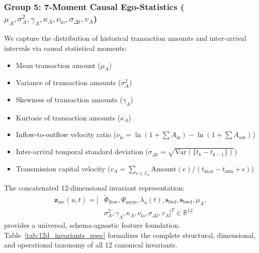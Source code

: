 \subsubsection{Group 5: 7-Moment Causal Ego-Statistics ($\mu_A, \sigma_A^2, \gamma_A, \kappa_A, \nu_{\text{io}}, \sigma_{\Delta t}, v_A$)}
We capture the distribution of historical transaction amounts and inter-arrival intervals via causal statistical moments:
\begin{itemize}
    \item Mean transaction amount ($\mu_A$)
    \item Variance of transaction amounts ($\sigma_A^2$)
    \item Skewness of transaction amounts ($\gamma_A$)
    \item Kurtosis of transaction amounts ($\kappa_A$)
    \item Inflow-to-outflow velocity ratio ($\nu_{\text{io}} = \ln(1 + \sum A_{\text{in}}) - \ln(1 + \sum A_{\text{out}})$)
    \item Inter-arrival temporal standard deviation ($\sigma_{\Delta t} = \sqrt{\mathrm{Var}(\{t_k - t_{k-1}\})}$)
    \item Transmission capital velocity ($v_A = \sum_{e \in \mathcal{E}_u} \text{Amount}(e) / (t_{\max} - t_{\min} + \epsilon)$)
\end{itemize}

The concatenated 12-dimensional invariant representation:
\begin{equation}
\begin{aligned}
\mathbf{z}_{\text{inv}}(u, t) = \big[ & \tilde{\Phi}_{\text{flow}}, \Psi_{\text{asym}}, \lambda_u(t), \mathbf{s}_{\text{fwd}}, \mathbf{s}_{\text{bwd}}, \mu_A, \\
& \sigma_A^2, \gamma_A, \kappa_A, \nu_{\text{io}}, \sigma_{\Delta t}, v_A \big]^T \in \mathbb{R}^{12}
\end{aligned}
\end{equation}
provides a universal, schema-agnostic feature foundation. Table~\ref{tab:12d_invariants_spec} formalizes the complete structural, dimensional, and operational taxonomy of all 12 canonical invariants.

